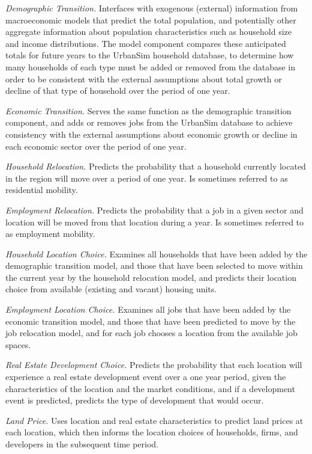 \emph{Demographic Transition.}  Interfaces with exogenous (external) information from macroeconomic models that predict the total population, and potentially other aggregate information about population characteristics such as household size and income distributions.  The model component compares these anticipated totals for future years to the UrbanSim household database, to determine how many households of each type must be added or removed from the database in order to be consistent with the external assumptions about total growth or decline of that type of household over the period of one year.

\emph{Economic Transition.}   Serves the same function as the demographic transition component, and adds or removes jobs from the UrbanSim database to achieve consistency with the external assumptions about economic growth or decline in each economic sector over the period of one year.

\emph{Household Relocation.}  Predicts the probability that a household currently located in the region will move over a period of one year. Is sometimes referred to as residential mobility.

\emph{Employment Relocation.}  Predicts the probability that a job in a given sector and location will be moved from that location during a year. Is sometimes referred to as employment mobility.

\emph{Household Location Choice.}     Examines all households that have been added by the demographic transition model, and those that have been selected to move within the current year by the household relocation model, and predicts their location choice from available (existing and vacant) housing units.

\emph{Employment Location Choice.}  Examines all jobs that have been added by the economic transition model, and those that have been predicted to move by the job relocation model, and for each job chooses a location from the available job spaces.

\emph{Real Estate Development Choice.}  Predicts the probability that each location will experience a real estate development event over a one year period, given the characteristics of the location and the market conditions, and if a development event is predicted, predicts the type of development that would occur.

\emph{Land Price.}  Uses location and real estate characteristics to predict land prices at each location, which then informs the location choices of households, firms, and developers in the subsequent time period.

